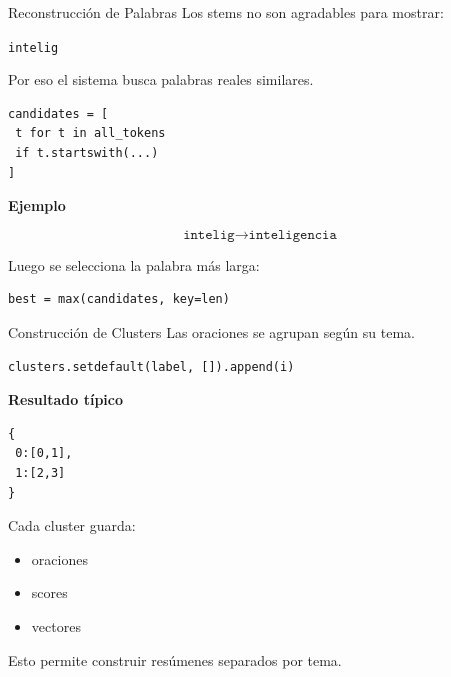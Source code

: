 
\begin{frame}[fragile]{Reconstrucción de Palabras}
Los stems no son agradables para mostrar:

\vspace{0.2em}

\begin{center}
\texttt{intelig}
\end{center}

\vspace{0.3em}

Por eso el sistema busca palabras reales similares.

\vspace{0.4em}

\begin{verbatim}
candidates = [
 t for t in all_tokens
 if t.startswith(...)
]
\end{verbatim}

\vspace{0.4em}

\textbf{Ejemplo}

\[
\texttt{intelig}
\rightarrow
\texttt{inteligencia}
\]

\vspace{0.3em}

Luego se selecciona la palabra más larga:

\begin{verbatim}
best = max(candidates, key=len)
\end{verbatim}

\end{frame}


\begin{frame}[fragile]{Construcción de Clusters}
Las oraciones se agrupan según su tema.

\vspace{0.4em}

\begin{verbatim}
clusters.setdefault(label, []).append(i)
\end{verbatim}

\vspace{0.4em}

\textbf{Resultado típico}

\begin{verbatim}
{
 0:[0,1],
 1:[2,3]
}
\end{verbatim}

\vspace{0.4em}

Cada cluster guarda:
\begin{itemize}
    \item oraciones
    \item scores
    \item vectores
\end{itemize}

\vspace{0.3em}

Esto permite construir resúmenes separados por tema.

\end{frame}

